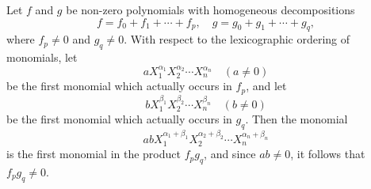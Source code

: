 Let $f$ and $g$ be non-zero polynomials with homogeneous decompositions
$$f = f_0 + f_1 + \cdots + f_p, \quad g = g_0 + g_1 + \cdots + g_q,$$
where $f_p \neq 0$ and $g_q \neq 0$. With respect to the lexicographic ordering of monomials, let
$$aX_1^{\alpha_1} X_2^{\alpha_2} \cdots X_n^{\alpha_n} \quad (a \neq 0)$$
be the first monomial which actually occurs in $f_p$, and let
$$bX_1^{\beta_1} X_2^{\beta_2} \cdots X_n^{\beta_n} \quad (b \neq 0)$$
be the first monomial which actually occurs in $g_q$. Then the monomial
$$abX_1^{\alpha_1+\beta_1} X_2^{\alpha_2+\beta_2} \cdots X_n^{\alpha_n+\beta_n}$$
is the first monomial in the product $f_p g_q$, and since $ab \neq 0$, it follows that $f_p g_q \neq 0$.
